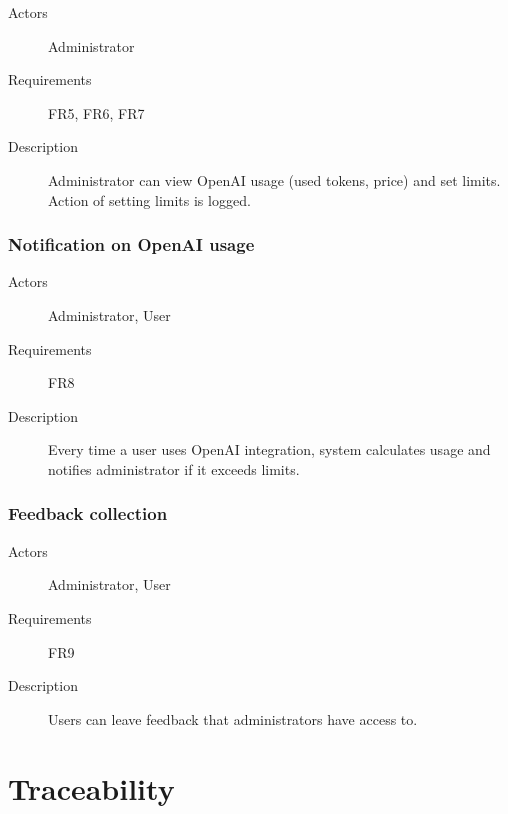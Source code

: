 \documentclass[
    english, %
]{VUMIFPSkursinis}
\begin{document}
\begin{description}
    \item[Actors] Administrator
    \item[Requirements] FR5, FR6, FR7
    \item[Description] Administrator can view OpenAI usage (used tokens, price) and set limits. Action of setting limits is logged.
\end{description}

\subsubsection{Notification on OpenAI usage}

\begin{description}
    \item[Actors] Administrator, User
    \item[Requirements] FR8
    \item[Description] Every time a user uses OpenAI integration, system calculates usage and notifies administrator if it exceeds limits.
\end{description}

\subsubsection{Feedback collection}

\begin{description}
    \item[Actors] Administrator, User
    \item[Requirements] FR9
    \item[Description] Users can leave feedback that administrators have access to.
\end{description}

\section{Traceability}

\listoffigures
\printbibliography[heading=bibintoc]
\end{document}
